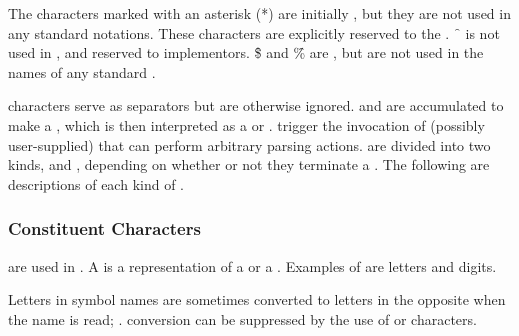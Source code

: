 The characters marked with an asterisk (*) are initially ,
%                     
but they are not used in any standard \commonlisp{} notations.
These characters are explicitly reserved to the .
\f{~} is not used in \clisp, and reserved to implementors.
\f{\$} and \f{\%} are  ,
but are not used in the names of any standard \commonlisp{} .

 characters serve as separators but are otherwise
ignored.   and   are accumulated
to make a , which is then interpreted as a  or .
 trigger the invocation of  (possibly
user-supplied) that can perform arbitrary parsing actions.
 are divided into two kinds,
 and ,
depending on whether or not they terminate a .
The following are descriptions of each kind of .

\subsubsection{Constituent Characters}

  are used in .
A  is a representation of a  or a .  
Examples of   are letters and digits.

Letters in symbol names are sometimes converted to 
letters in the opposite  when the name is read;
\seesection\ReadtableCaseReadEffect.
 conversion can be suppressed by the use 
of  or  characters.

